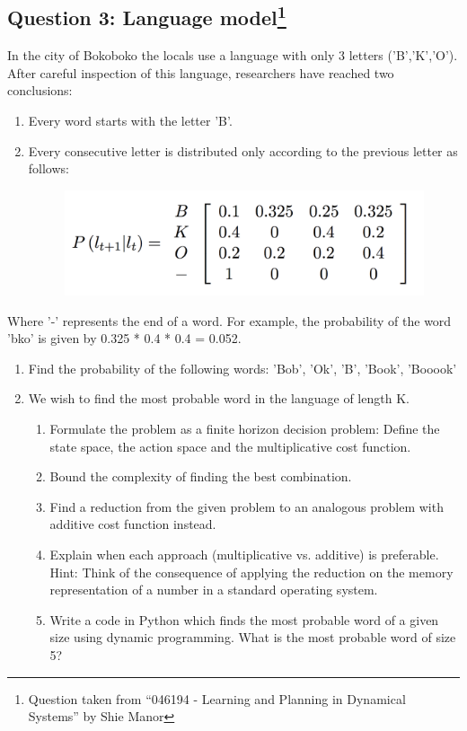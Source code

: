 \documentclass[11pt]{article}
\begin{document}
\subsection{Question 3: Language model\protect\footnote{Question taken from ``046194 - Learning and Planning in Dynamical Systems'' by Shie Manor\textcopyright}}
In the city of Bokoboko the locals use a language
with only 3 letters ('B','K','O'). After careful inspection of this language, researchers have
reached two conclusions:
\begin{enumerate}[label=(\alph*)]
\item Every word starts with the letter 'B'.
\item Every consecutive letter is distributed only according to the previous letter as follows: 
\begin{figure}[ht!]
  \centering
  \includegraphics[width=.6780\linewidth]{mat.png}
\end{figure}
\end{enumerate}




Where '-' represents the end of a word. For example, the probability of the word
'bko' is given by 0.325 * 0.4 * 0.4 = 0.052.

\begin{enumerate}
\item Find the probability of the following words: 'Bob', 'Ok', 'B', 'Book', 'Booook'
\item We wish to find the most probable word in the language of length K.
\begin{enumerate}[label=(\alph*)]
\item Formulate the problem as a finite horizon decision problem: Define the state
space, the action space and the multiplicative cost function.
\item Bound the complexity of finding the best combination.
\item Find a reduction from the given problem to an analogous problem with additive
cost function instead.
\item Explain when each approach (multiplicative vs. additive) is preferable.
Hint: Think of the consequence of applying the reduction on the memory representation
of a number in a standard operating system.
\item  Write a code in Python which finds the most probable word of a given size using
dynamic programming. What is the most probable word of size 5?
\end{enumerate}
\end{enumerate}
\end{document}
